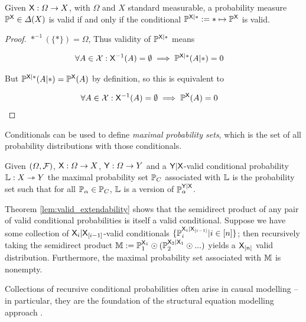 \begin{theorem}\label{th:valid_agree}
Given $\mathsf{X}:\Omega\to X$, with $\Omega$ and $X$ standard measurable, a probability measure $\mathbb{P}^{\mathsf{X}}\in \Delta(X)$ is valid if and only if the conditional $\mathbb{P}^{\mathsf{X}|*}:=*\mapsto \mathbb{P}^{\mathsf{X}}$ is valid.
\end{theorem}

\begin{proof}
$*^{-1} (\{*\})=\Omega$, Thus validity of $\mathbb{P}^{\mathsf{X}|*}$ means 

\begin{align}
    \forall A\in \mathcal{X}: \mathsf{X}^{-1}( A)=\emptyset \implies \mathbb{P}^{\mathsf{X}|*}(A|*)&=0
\end{align}

But $\mathbb{P}^{\mathsf{X}|*}(A|*)=\mathbb{P}^{\mathsf{X}}(A)$ by definition, so this is equivalent to

\begin{align}
    \forall A\in \mathcal{X}: \mathsf{X}^{-1}( A)=\emptyset \implies \mathbb{P}^{\mathsf{X}}(A)&=0
\end{align}
\end{proof}

Conditionals can be used to define \emph{maximal probability sets}, which is the set of all probability distributions with those conditionals.

\begin{definition}
Given $(\Omega,\mathcal{F})$, $\mathsf{X}:\Omega\to X$, $\mathsf{Y}:\Omega\to Y$ and a $\mathsf{Y}|\mathsf{X}$-valid conditional probability $\mathbb{L}:X\rightarrowtriangle Y$ the maximal probability set $\mathbb{P}_C$ associated with $\mathbb{L}$ is the probability set such that for all $\mathbb{P}_\alpha\in \mathbb{P}_C$, $\mathbb{L}$ is a version of $\mathbb{P}_\alpha^{\mathsf{Y}|\mathsf{X}}$.
\end{definition}

Theorem \ref{lem:valid_extendability} shows that the semidirect product of any pair of valid conditional probabilities is itself a valid conditional. Suppose we have some collection of $\mathsf{X}_i|\mathsf{X}_{[i-1]}$-valid conditionals $\{\mathbb{P}_i^{\mathsf{X}_i|\mathsf{X}_{[i-1]}}|i\in [n]\}$; then recursively taking the semidirect product $\mathbb{M}:=\mathbb{P}_1^{\mathsf{X}_1}\odot (\mathbb{P}_2^{\mathsf{X}_2|\mathsf{X}_{1}}\odot ...)$ yields a $\mathsf{X}_{[n]}$ valid distribution. Furthermore, the maximal probability set associated with $\mathbb{M}$ is nonempty.

Collections of recursive conditional probabilities often arise in causal modelling -- in particular, they are the foundation of the structural equation modelling approach \citet{richardson2013single,pearl_causality:_2009}.

